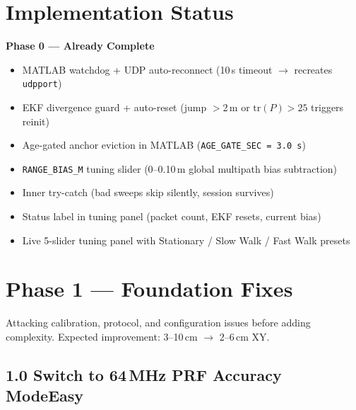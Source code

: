 \documentclass[11pt,a4paper]{article}
\newcommand{\dif}[1]{\texorpdfstring{\hfill#1}{}}
\newcommand{\easy}{\textcolor{dkgreen}{\textbf{Easy}}}
\begin{document}
\section{Implementation Status}

\begin{donebox}
\textbf{Phase 0 --- Already Complete}
\begin{itemize}[leftmargin=2em,topsep=4pt,itemsep=2pt]
  \item[$\checkmark$] MATLAB watchdog + UDP auto-reconnect (10\,s timeout $\to$ recreates \texttt{udpport})
  \item[$\checkmark$] EKF divergence guard + auto-reset (jump $>$2\,m or $\mathrm{tr}(P) > 25$ triggers reinit)
  \item[$\checkmark$] Age-gated anchor eviction in MATLAB (\texttt{AGE\_GATE\_SEC = 3.0\,s})
  \item[$\checkmark$] \texttt{RANGE\_BIAS\_M} tuning slider (0--0.10\,m global multipath bias subtraction)
  \item[$\checkmark$] Inner try-catch (bad sweeps skip silently, session survives)
  \item[$\checkmark$] Status label in tuning panel (packet count, EKF resets, current bias)
  \item[$\checkmark$] Live 5-slider tuning panel with Stationary / Slow Walk / Fast Walk presets
\end{itemize}
\end{donebox}

\section{Phase 1 --- Foundation Fixes}

\begin{phasebox}
Attacking calibration, protocol, and configuration issues before adding complexity.
Expected improvement: 3--10\,cm $\to$ 2--6\,cm XY.
\end{phasebox}

\subsection{1.0 Switch to 64\,MHz PRF Accuracy Mode\dif{\easy}}
\end{document}
